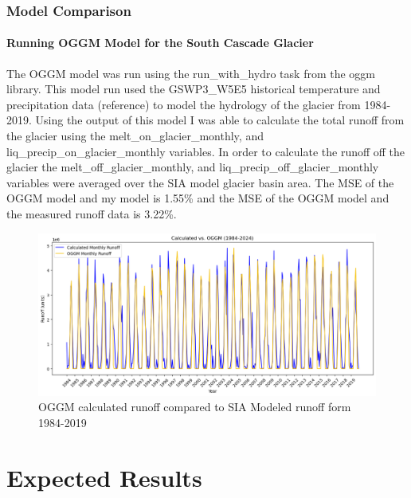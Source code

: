 \documentclass{article}
\begin{document}
\subsubsection{Model Comparison}
\paragraph{Running OGGM Model for the South Cascade Glacier}

The OGGM model was run using the run\_with\_hydro task from the oggm library. This model run used the GSWP3\_W5E5 historical temperature and 
precipitation data (reference) to model the hydrology of the glacier from 1984-2019. Using the output of this model I was able to calculate the total 
runoff from the glacier using the melt\_on\_glacier\_monthly, and liq\_precip\_on\_glacier\_monthly variables. In order 
to calculate the runoff off the glacier the melt\_off\_glacier\_monthly, and liq\_precip\_off\_glacier\_monthly variables were averaged over the 
SIA model glacier basin area. The MSE of the OGGM model and my model is 1.55\% and the MSE of the OGGM model and the measured runoff data is 3.22\%.

\begin{figure}[h!]
    \includegraphics[width=1.3\textwidth]{Plots/oggm_vs_calculated.png}
    \caption{OGGM calculated runoff compared to SIA Modeled runoff form 1984-2019}
    \label{fig:oggm_model_run_1984_2019}
\end{figure}
\FloatBarrier

\section{Expected Results}
\end{document}
